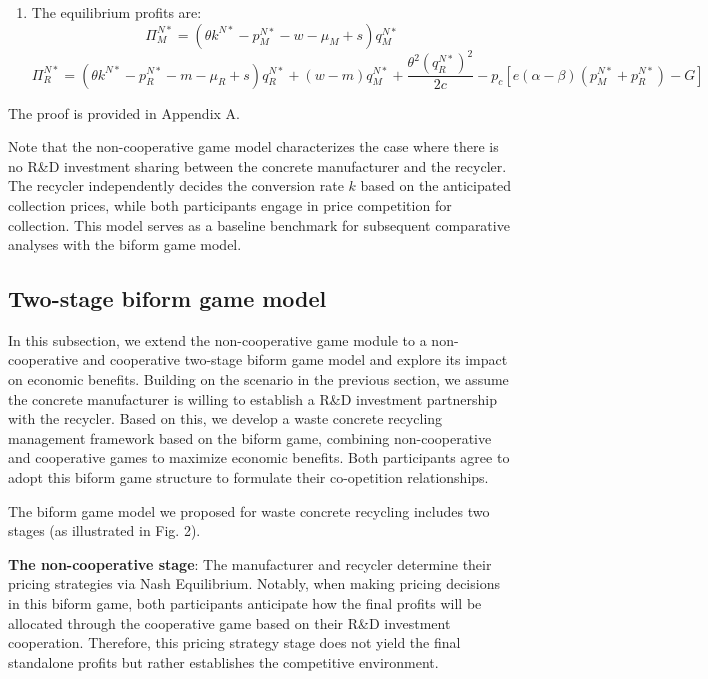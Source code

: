 \documentclass[authoryear,preprint,review,times,10pt]{elsarticle}
\begin{document}
\begin{prop}
\begin{enumerate}[label={(\arabic*)}]
\item The equilibrium profits are:
\begin{equation}
\Pi_M^{N*} = (\theta k^{N*} - p_M^{N*} - w - \mu_M + s)q_M^{N*}
\label{eq:Pi_MN_star}
\end{equation}
\begin{equation}
\Pi_R^{N*} = (\theta k^{N*} - p_R^{N*} - m - \mu_R + s)q_R^{N*} + (w - m)q_M^{N*}
+ \frac{\theta^2(q_R^{N*})^2}{2c} - p_c\left[ e(\alpha - \beta)(p_M^{N*} + p_R^{N*}) - G \right]
\label{eq:Pi_RN_star}
\end{equation}
\end{enumerate}
\end{prop}

 The proof is provided in Appendix A.

Note that the non-cooperative game model characterizes the case where there is no R\&D investment sharing between the concrete manufacturer and the recycler. The recycler independently decides the conversion rate $k$ based on the anticipated collection prices, while both participants engage in price competition for collection. This model serves as a baseline benchmark for subsequent comparative analyses with the biform game model.

\subsection{Two-stage biform game model}
\label{sec:biform_model}
In this subsection, we extend the non-cooperative game module to a non-cooperative and cooperative two-stage biform game model and explore its impact on economic benefits. Building on the scenario in the previous section, we assume the concrete manufacturer is willing to establish a R\&D investment partnership with the recycler. Based on this, we develop a waste concrete recycling management framework based on the biform game, combining non-cooperative and cooperative games to maximize economic benefits. Both participants agree to adopt this biform game structure to formulate their co-opetition relationships.

The biform game model we proposed for waste concrete recycling includes two stages (as illustrated in Fig. 2).

\textbf{The non-cooperative stage}: The manufacturer and recycler determine their pricing strategies via Nash Equilibrium. Notably, when making pricing decisions in this biform game, both participants anticipate how the final profits will be allocated through the cooperative game based on their R\&D investment cooperation. Therefore, this pricing strategy stage does not yield the final standalone profits but rather establishes the competitive environment.
\end{document}

